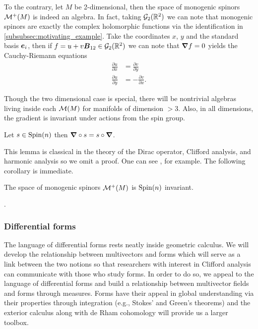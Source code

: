 To the contrary, let $M$ be 2-dimensional, then the space of monogenic spinors $\mathcal{M}^+(M)$ is indeed an algebra. In fact, taking $\mathcal{G}_2(\mathbb{R}^2)$ we can note that monogenic spinors are exactly the complex holomorphic functions via the identification in \cref{subsubsec:motivating_example}. Take the coordinates $x$, $y$ and the standard basis $\boldsymbol{e}_i$, then if $f=u+v\boldsymbol{B}_{12} \in \mathcal{G}_2(\mathbb{R}^2)$ we can note that $\boldsymbol{\nabla} f =0$ yields the Cauchy-Riemann equations
\begin{align}
    \frac{\partial u}{\partial x} &= \frac{\partial v}{\partial y}\\
    \frac{\partial u}{\partial y} &= -\frac{\partial v}{\partial x}.
\end{align}

Though the two dimensional case is special, there will be nontrivial algebras living inside each $\mathcal{M}(M)$ for manifolds of dimension $>3$. Also, in all dimensions, the gradient is invariant under actions from the spin group.
\begin{lemma}
\label{lem:clifford_invariant}
Let $s\in \operatorname{Spin}(n)$ then $\boldsymbol{\nabla} \circ s = s \circ \boldsymbol{\nabla}$.
\end{lemma}
This lemma is classical in the theory of the Dirac operator, Clifford analysis, and harmonic analysis so we omit a proof.  One can see \cite{janssens_special_nodate}, for example. The following corollary is immediate.
\begin{corollary}
The space of monogenic spinors $\mathcal{M}^+(M)$ is $\operatorname{Spin}(n)$ invariant.
\end{corollary}
.

\subsubsection{Differential forms}
\label{subsubsec:differential_forms}

The language of differential forms rests neatly inside geometric calculus. We will develop the relationship between multivectors and forms which will serve as a link between the two notions so that researchers with interest in Clifford analysis can communicate with those who study forms. In order to do so, we appeal to the language of differential forms and build a relationship between multivector fields and forms through measures. Forms have their appeal in global understanding via their properties through integration (e.g., Stokes' and Green's theorems) and the exterior calculus along with de Rham cohomology will provide us a larger toolbox.

